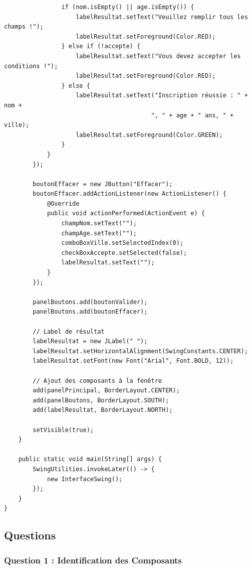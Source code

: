\documentclass[11pt,a4paper]{article}
\begin{document}
\begin{lstlisting}
                if (nom.isEmpty() || age.isEmpty()) {
                    labelResultat.setText("Veuillez remplir tous les champs !");
                    labelResultat.setForeground(Color.RED);
                } else if (!accepte) {
                    labelResultat.setText("Vous devez accepter les conditions !");
                    labelResultat.setForeground(Color.RED);
                } else {
                    labelResultat.setText("Inscription réussie : " + nom + 
                                         ", " + age + " ans, " + ville);
                    labelResultat.setForeground(Color.GREEN);
                }
            }
        });
        
        boutonEffacer = new JButton("Effacer");
        boutonEffacer.addActionListener(new ActionListener() {
            @Override
            public void actionPerformed(ActionEvent e) {
                champNom.setText("");
                champAge.setText("");
                comboBoxVille.setSelectedIndex(0);
                checkBoxAccepte.setSelected(false);
                labelResultat.setText("");
            }
        });
        
        panelBoutons.add(boutonValider);
        panelBoutons.add(boutonEffacer);
        
        // Label de résultat
        labelResultat = new JLabel(" ");
        labelResultat.setHorizontalAlignment(SwingConstants.CENTER);
        labelResultat.setFont(new Font("Arial", Font.BOLD, 12));
        
        // Ajout des composants à la fenêtre
        add(panelPrincipal, BorderLayout.CENTER);
        add(panelBoutons, BorderLayout.SOUTH);
        add(labelResultat, BorderLayout.NORTH);
        
        setVisible(true);
    }
    
    public static void main(String[] args) {
        SwingUtilities.invokeLater(() -> {
            new InterfaceSwing();
        });
    }
}
\end{lstlisting}

\subsection{Questions}

\subsubsection{Question 1 : Identification des Composants}
\end{document}
